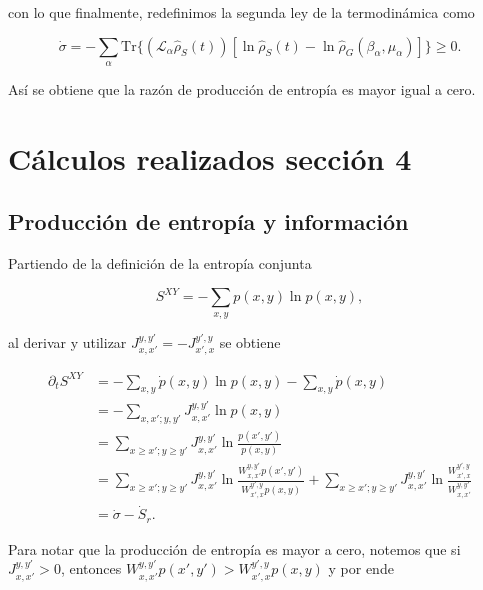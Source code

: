 \begin{appendixs}
con lo que finalmente, redefinimos la segunda ley de la termodinámica como

\begin{equation*}
    \dot{\sigma} = - \sum_{\alpha} \text{Tr}\{(\mathcal{L}_{\alpha}\hat{\rho}_{S}(t)) [\ln \hat{\rho}_{S}(t) -\ln \hat{\rho}_{G}(\beta_{\alpha},\mu_{\alpha}) ] \} \geq 0.
\end{equation*}

Así se obtiene que la razón de producción de entropía es mayor igual a cero.

\label{apendix:thermolaws}

\newpage 

    \section{Cálculos realizados sección 4}
    \subsection{Producción de entropía y información}
    Partiendo de la definición de la entropía conjunta

    \begin{equation*}
        S^{XY} = - \sum_{x,y}p(x,y) \ln p(x,y),
    \end{equation*}

    al derivar y utilizar $J_{x,x'}^{y,y'} = - J_{x',x}^{y',y}$ se obtiene

    \begin{align*}
        \partial_{t}S^{XY} & = - \sum_{x,y} \dot{p}(x,y) \ln p(x,y) - \sum_{x,y} \dot{p}(x,y) \\
                           & = - \sum_{x,x';y,y'} J_{x,x'}^{y,y'} \ln p(x,y)  \\
                           & = \sum_{x \geq x'; y\geq y'} J_{x,x'}^{y,y'} \ln \frac{p(x',y')}{p(x,y)} \\
                           & = \sum_{x \geq x'; y\geq y'} J_{x,x'}^{y,y'} \ln \frac{W_{x,x'}^{y,y'} p(x',y')}{W_{x',x}^{y',y} p(x,y)} +  \sum_{x \geq x'; y\geq y'} J_{x,x'}^{y,y'} \ln \frac{W_{x',x}^{y',y} }{W_{x,x'}^{y,y'} } \\
                           & = \dot{\sigma} - \dot{S}_{r}.
    \end{align*}

Para notar que la producción de entropía es mayor a cero, notemos que si $J_{x,x'}^{y,y'} > 0$, entonces $W_{x,x'}^{y,y'}p(x',y') > W_{x',x}^{y',y}p(x,y) $  y por ende


\end{appendixs}
